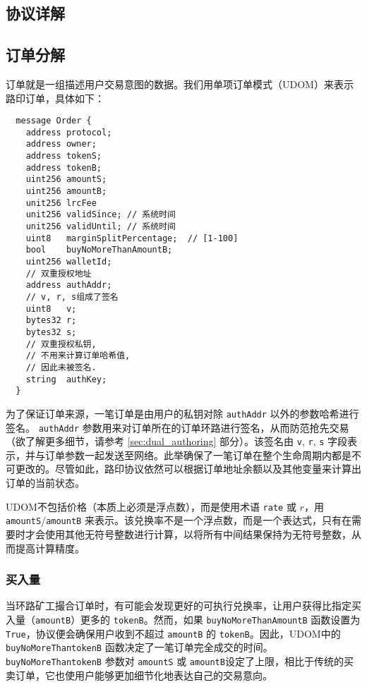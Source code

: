 \documentclass[UTF8]{ctexart}
\begin{document}
\begin{multicols}{2}
\section{协议详解\label{sec:protocol}}

\subsection{订单分解\label{anatomy}}
订单就是一组描述用户交易意图的数据。我们用单项订单模式（UDOM）来表示路印订单，具体如下：

\begin{verbatim}
  message Order {
    address protocol;
    address owner;
    address tokenS;
    address tokenB;
    uint256 amountS;
    uint256 amountB;
    unit256 lrcFee
    unit256 validSince; // 系统时间
    unit256 validUntil; // 系统时间
    uint8   marginSplitPercentage;  // [1-100]
    bool    buyNoMoreThanAmountB;
    uint256 walletId;
    // 双重授权地址
    address authAddr;
   	// v, r, s组成了签名
    uint8   v;       
    bytes32 r;
    bytes32 s;
    // 双重授权私钥,
    // 不用来计算订单哈希值,
    // 因此未被签名.
    string  authKey;          
  }
\end{verbatim}


为了保证订单来源，一笔订单是由用户的私钥对除 \verb|authAddr| 以外的参数哈希进行签名。 \verb|authAddr| 参数用来对订单所在的订单环路进行签名，从而防范抢先交易（欲了解更多细节，请参考 \ref{sec:dual_authoring} 部分）。该签名由 \verb|v|, \verb|r|, \verb|s| 字段表示，并与订单参数一起发送至网络。此举确保了一笔订单在整个生命周期内都是不可更改的。尽管如此，路印协议依然可以根据订单地址余额以及其他变量来计算出订单的当前状态。



UDOM不包括价格（本质上必须是浮点数），而是使用术语 \verb|rate| 或 $r$，用 \verb|amountS|/\verb|amountB| 来表示。该兑换率不是一个浮点数，而是一个表达式，只有在需要时才会使用其他无符号整数进行计算，以将所有中间结果保持为无符号整数，从而提高计算精度。 

\subsubsection{买入量}

当环路矿工撮合订单时，有可能会发现更好的可执行兑换率，让用户获得比指定买入量（\verb|amountB|）更多的 \verb|tokenB|。然而，如果 \verb|buyNoMoreThanAmountB| 函数设置为 \verb|True|，协议便会确保用户收到不超过 \verb|amountB| 的 \verb|tokenB|。因此，UDOM中的 \verb|buyNoMoreThantokenB| 函数决定了一笔订单完全成交的时间。\verb|buyNoMoreThantokenB| 参数对 \verb|amountS| 或 \verb|amountB|设定了上限，相比于传统的买卖订单，它也使用户能够更加细节化地表达自己的交易意向。


\end{multicols}
\end{document}
